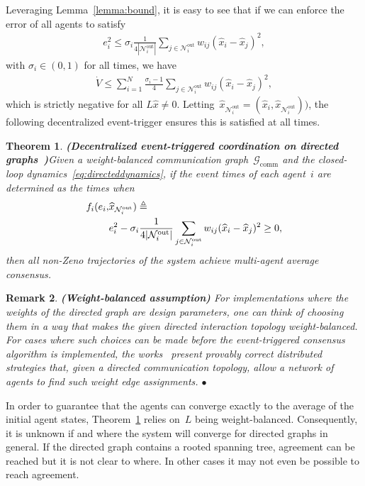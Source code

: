 \documentclass{autart}
\newtheorem{theorem}{Theorem}[section]
\newtheorem{remark}[theorem]{Remark}
\newcommand{\GG}{{\mathcal{G}}}
\newcommand{\NN}{{\mathcal{N}}}
\newcommand{\commgraph}{\GG_\text{comm}}
\renewcommand{\hat}{\widehat}
\newcommand{\oprocendsymbol}{\hbox{$\bullet$}}
\newcommand{\oprocend}{\relax\ifmmode\else\unskip\hfill\fi\oprocendsymbol}
\newcommand{\longthmtitle}[1]{\mbox{}\textup{\textbf{(#1)}}}
\begin{document}
Leveraging Lemma~\ref{lemma:bound}, it is easy to see that if we can
enforce the error of all agents to satisfy
\begin{align}\label{eq:enforce3}
  e_i^2 \leq \sigma_i \frac{1}{4 |\NN_i^\text{out}|} \sum_{j \in
  \NN_i^\text{out}} w_{ij} (\hat{x}_i - \hat{x}_j)^2 ,
\end{align}
with $\sigma_i \in (0,1)$ for all times, we have
\begin{align}\label{eq:actual}
  \dot{V} \leq \sum_{i=1}^N \frac{\sigma_i - 1}{4} \sum_{j \in
  \NN_i^\text{out}} w_{ij} (\hat{x}_i - \hat{x}_j)^2,
\end{align}
which is strictly negative for all $L\hat{x} \neq 0$. 
Letting~$\hat{x}_{\NN_i^\text{out}} = (\hat{x}_i, \hat{x}_{\NN_i^\text{out}}))$, the following
decentralized event-trigger ensures this is satisfied at all times.

\begin{theorem}\longthmtitle{Decentralized event-triggered coordination
    on directed graphs~\citep{CN-JC:16-auto}}\label{th:state-directed}
  Given {a weight-balanced communication graph~$\commgraph$
    and} the closed-loop dynamics~\eqref{eq:directeddynamics}, if the
  event times of each agent~$i$ are determined as the times when
  \begin{align}\label{eq:trigger3}
    f_i(e_i,& \hat{x}_{\NN_i^\text{out}}) \triangleq \\ 
    & e_i^2 - \sigma_i \frac{1}{4 |\NN_i^\text{out}|}
    \sum_{j \in \NN_i^\text{out}} w_{ij} (\hat{x}_i - \hat{x}_j)^2 \geq 0, \notag
  \end{align}
  then all non-Zeno trajectories of the system achieve multi-agent
  average consensus.
\end{theorem}

\begin{remark}\longthmtitle{Weight-balanced assumption} {\rm For
    implementations where the weights of the directed graph are design
    parameters, one can think of choosing them in a way that makes the
    given directed interaction topology weight-balanced. For cases
    where such choices can be made before the event-triggered
    consensus algorithm is implemented, the
    works~\citep{BG-JC:09c,AR-TC-CNH:14} present provably correct
    distributed strategies that, given a directed communication
    topology, allow a network of agents to find such weight edge
    assignments. } \oprocend
\end{remark}

In order to guarantee that the agents can converge exactly to the
average of the initial agent states, Theorem~\ref{th:state-directed}
relies on~$L$ being weight-balanced. Consequently, it is unknown if
and where the system will converge for directed graphs in general.  If
the directed graph contains a rooted spanning tree, agreement can be
reached but it is not clear to where. In other cases it may not even
be possible to reach agreement.
\end{document}
